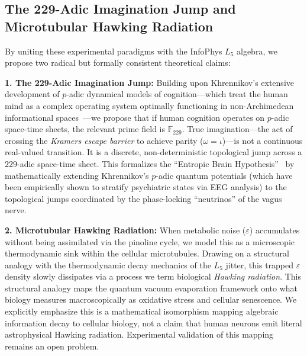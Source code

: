 \subsection{The 229-Adic Imagination Jump and Microtubular Hawking Radiation}

By uniting these experimental paradigms with the InfoPhys $L_5$ algebra, we propose two radical but formally consistent theoretical claims:

\textbf{1. The 229-Adic Imagination Jump:} Building upon Khrennikov's extensive development of $p$-adic dynamical models of cognition---which treat the human mind as a complex operating system optimally functioning in non-Archimedean informational spaces~\cite{khrennikov2004, khrennikov2021}---we propose that if human cognition operates on $p$-adic space-time sheets, the relevant prime field is $\mathbb{F}_{229}$. True imagination---the act of crossing the \emph{Kramers escape barrier} to achieve parity ($\omega = \iota$)---is not a continuous real-valued transition. It is a discrete, non-deterministic topological jump across a $229$-adic space-time sheet. This formalizes the ``Entropic Brain Hypothesis''~\cite{carhart2014} by mathematically extending Khrennikov's $p$-adic quantum potentials (which have been empirically shown to stratify psychiatric states via EEG analysis) to the topological jumps coordinated by the phase-locking ``neutrinos'' of the vagus nerve.

\begin{hypothesis}
\textbf{2. Microtubular Hawking Radiation:} When metabolic noise ($\varepsilon$) accumulates without being assimilated via the pinoline cycle, we model this as a microscopic thermodynamic sink within the cellular microtubules. Drawing on a structural analogy with the thermodynamic decay mechanics of the $L_5$ jitter, this trapped $\varepsilon$ density slowly dissipates via a process we term biological \emph{Hawking radiation}. This structural analogy maps the quantum vacuum evaporation framework onto what biology measures macroscopically as oxidative stress and cellular senescence. We explicitly emphasize this is a mathematical isomorphism mapping algebraic information decay to cellular biology, not a claim that human neurons emit literal astrophysical Hawking radiation. Experimental validation of this mapping remains an open problem.
\end{hypothesis}

